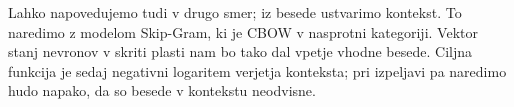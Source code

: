 
Lahko napovedujemo tudi v drugo smer; iz besede ustvarimo kontekst.
To naredimo z modelom Skip-Gram, ki je CBOW v nasprotni kategoriji.
Vektor stanj nevronov v skriti plasti nam bo tako dal vpetje vhodne besede.
Ciljna funkcija je sedaj negativni logaritem verjetja konteksta; pri izpeljavi
pa naredimo hudo napako, da so besede v kontekstu neodvisne.



